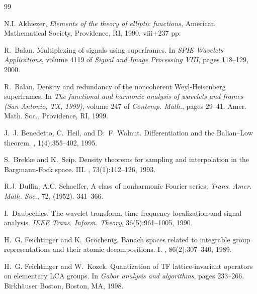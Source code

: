 \documentclass[12pt]{amsart}
\begin{document}
 

\begin{thebibliography}{99}

 N.I. Akhiezer,  {\em  Elements of the theory of elliptic functions,}
American Mathematical Society, Providence, RI, 1990. viii+237 pp. 


R.~Balan.
\newblock Multiplexing of signals using superframes.
\newblock In {\em SPIE Wavelets Applications}, volume 4119 of {\em Signal and
  Image Processing VIII}, pages 118--129, 2000.



R.~Balan.
\newblock Density and redundancy of the noncoherent {W}eyl-{H}eisenberg
  superframes.
\newblock In {\em The functional and harmonic analysis of wavelets and frames
  (San Antonio, TX, 1999)}, volume 247 of {\em Contemp. Math.}, pages 29--41.
  Amer. Math. Soc., Providence, RI, 1999.






J.~J. Benedetto, C.~Heil, and D.~F. Walnut.
\newblock Differentiation and the {B}alian--{L}ow theorem.
, 1(4):355--402, 1995.


S.~Brekke and K.~Seip.
\newblock Density theorems for sampling and interpolation in the
  {B}argmann-{F}ock space. {III}.
, 73(1):112--126, 1993.




 R.J. Duffin, A.C. Schaeffer,   A class of nonharmonic Fourier series,  {\em Trans. Amer. Math. Soc.},   72,  (1952). 341--366.  

 
I.~Daubechies,
  The wavelet transform, time-frequency localization and signal 
  analysis.
 {\em IEEE Trans. Inform. Theory}, 36(5):961--1005, 1990.



H.~G. Feichtinger and K.~Gr{\"o}chenig.
\newblock Banach spaces related to integrable group representations and their
  atomic decompositions. {I}.
, 86(2):307--340, 1989.



H.~G. Feichtinger and W.~Kozek.
\newblock Quantization of {T}{F} lattice-invariant operators on elementary
  {L}{C}{A} groups.
\newblock In {\em Gabor analysis and algorithms}, pages 233--266. Birkh\"auser
  Boston, Boston, MA, 1998.


\end{thebibliography}
\end{document}
